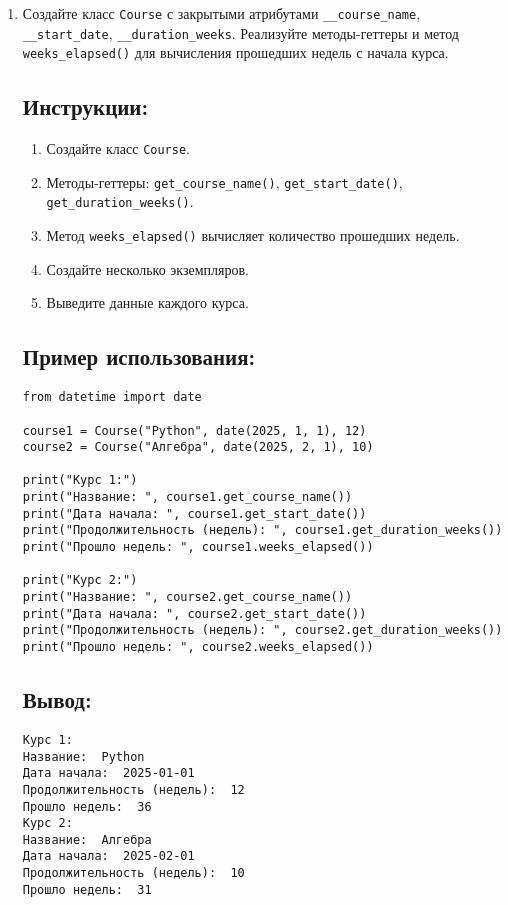 \begin{enumerate}
\item
Создайте класс \texttt{Course} с закрытыми атрибутами \texttt{\_\_course\_name}, \texttt{\_\_start\_date}, \texttt{\_\_duration\_weeks}. Реализуйте методы-геттеры и метод \texttt{weeks\_elapsed()} для вычисления прошедших недель с начала курса.

\subsection*{Инструкции:}
\begin{enumerate}
    \item Создайте класс \texttt{Course}.
    \item Методы-геттеры: \texttt{get\_course\_name()}, \texttt{get\_start\_date()}, \texttt{get\_duration\_weeks()}.
    \item Метод \texttt{weeks\_elapsed()} вычисляет количество прошедших недель.
    \item Создайте несколько экземпляров.
    \item Выведите данные каждого курса.
\end{enumerate}

\subsection*{Пример использования:}
\begin{lstlisting}[caption=Пример кода]
from datetime import date

course1 = Course("Python", date(2025, 1, 1), 12)
course2 = Course("Алгебра", date(2025, 2, 1), 10)

print("Курс 1:")
print("Название: ", course1.get_course_name())
print("Дата начала: ", course1.get_start_date())
print("Продолжительность (недель): ", course1.get_duration_weeks())
print("Прошло недель: ", course1.weeks_elapsed())

print("Курс 2:")
print("Название: ", course2.get_course_name())
print("Дата начала: ", course2.get_start_date())
print("Продолжительность (недель): ", course2.get_duration_weeks())
print("Прошло недель: ", course2.weeks_elapsed())
\end{lstlisting}

\subsection*{Вывод:}
\begin{lstlisting}[caption=Ожидаемый вывод]
Курс 1:
Название:  Python
Дата начала:  2025-01-01
Продолжительность (недель):  12
Прошло недель:  36
Курс 2:
Название:  Алгебра
Дата начала:  2025-02-01
Продолжительность (недель):  10
Прошло недель:  31
\end{lstlisting}


\end{enumerate}
